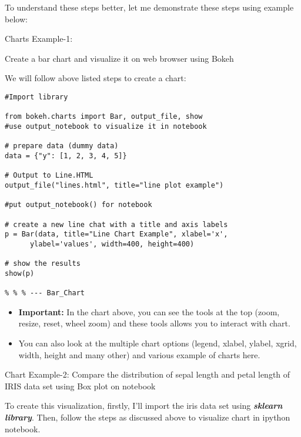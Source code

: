 \documentclass[a4paper,12pt]{article}
\begin{document}
\newpage

To understand these steps better, let me demonstrate these steps using example below:

Charts Example-1: 

Create a bar chart and visualize it on web browser using Bokeh

We will follow above listed steps to create a chart:

\begin{framed}
\begin{verbatim}
#Import library

from bokeh.charts import Bar, output_file, show 
#use output_notebook to visualize it in notebook

# prepare data (dummy data)
data = {"y": [1, 2, 3, 4, 5]}

# Output to Line.HTML
output_file("lines.html", title="line plot example") 

#put output_notebook() for notebook

# create a new line chat with a title and axis labels
p = Bar(data, title="Line Chart Example", xlabel='x', 
      ylabel='values', width=400, height=400)

# show the results
show(p)

% % % --- Bar_Chart
\end{verbatim}
\end{framed}
\begin{itemize}
\item \textbf{Important:} In the chart above,  you can see the tools at the top (zoom, resize, reset, wheel zoom) and these 
tools allows you to interact with chart. 
\item You can also look at the multiple chart options (legend, xlabel, ylabel, xgrid, width, height and many other) and 
various example of charts here.
\end{itemize}



\newpage
Chart Example-2: Compare the distribution of sepal length and petal length of IRIS data set using 
Box plot on notebook

To create this visualization, firstly, I’ll import the iris data set using \textbf{\textit{sklearn library}}. Then, 
follow the steps as discussed above to visualize chart in ipython notebook.
\end{document}
